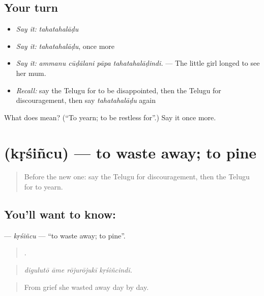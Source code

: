 \subsection*{Your turn}
\begin{itemize}
\raggedright
  \item \emph{Say it:} \emph{tahatahalāḍu}
  \item \emph{Say it:} \emph{tahatahalāḍu}, once more
  \item \emph{Say it:} \emph{ammanu cūḍālani pāpa tahatahalāḍindi.} — The little girl longed to see her mum.
  \item \emph{Recall:} say the Telugu for to be disappointed, then the Telugu for discouragement, then say \emph{tahatahalāḍu} again
\end{itemize}

\begin{tcolorbox}[breakable,colback=teal!4,colframe=teal!35!black,title={Before you move on}]
What does  mean? (\textquotedblleft{}To yearn; to be restless for\textquotedblright{}.) Say it once more.
\end{tcolorbox}
\section[\texorpdfstring{\te{కృశించు} (kṛśiñcu)}{కృశించు (kṛśiñcu)}]{ (kṛśiñcu) — to waste away; to pine}

\label{lesson:TE-C502-krsincu}



\begin{quote}
Before the new one: say the Telugu for discouragement, then the Telugu for to yearn.
\end{quote}

\subsection*{You'll want to know: }
\textbf{} — \emph{kṛśiñcu} — \textquotedblleft{}to waste away; to pine\textquotedblright{}.

\begin{quote}
   .
\end{quote}

\begin{quote}
\emph{digulutō āme rōjurōjukī kṛśiñcindi.}
\end{quote}

\begin{quote}
From grief she wasted away day by day.
\end{quote}

